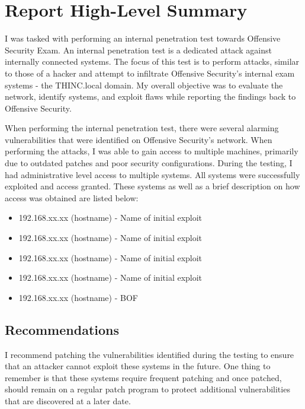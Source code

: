 
\chapter{\label{ch:summary}Report High-Level Summary}
I was tasked with performing an internal penetration test towards Offensive
Security Exam. An internal penetration test is a dedicated attack against
internally connected systems. The focus of this test is to perform attacks,
similar to those of a hacker and attempt to infiltrate Offensive Security's
internal exam systems - the THINC.local domain. My overall objective was to
evaluate the network, identify systems, and exploit flaws while reporting
the findings back to Offensive Security.

When performing the internal penetration test, there were several alarming
vulnerabilities that were identified on Offensive Security's network. When
performing the attacks, I was able to gain access to multiple machines,
primarily due to outdated patches and poor security configurations. During
the testing, I had administrative level access to multiple systems. All
systems were successfully exploited and access granted. These systems as
well as a brief description on how access was obtained are listed below:

\begin{itemize}
  \item 192.168.xx.xx (hostname) - Name of initial exploit
  \item 192.168.xx.xx (hostname) - Name of initial exploit
  \item 192.168.xx.xx (hostname) - Name of initial exploit
  \item 192.168.xx.xx (hostname) - Name of initial exploit
  \item 192.168.xx.xx (hostname) - BOF
\end{itemize}

\section{\label{sec:recommendations}Recommendations}
I recommend patching the vulnerabilities identified during the testing to
ensure that an attacker cannot exploit these systems in the future. One thing
to remember is that these systems require frequent patching and once patched,
should remain on a regular patch program to protect additional vulnerabilities
that are discovered at a later date.
